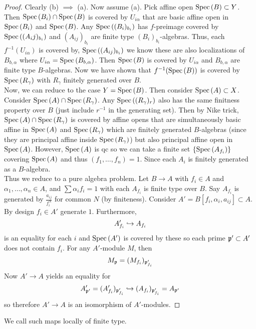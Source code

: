 \documentclass[12pt]{article}
\begin{document}
\begin{proof}
Clearly (b) $\implies$ (a). Now assume (a). Pick affine open $\mathrm{Spec}\left( B \right) \subset Y$. Then $\mathrm{Spec}\left( B_i \right) \cap \mathrm{Spec}\left( B \right)$ is covered by $U_{i \alpha}$ that are basic affine open in $\mathrm{Spec}\left( B_i \right)$ and $\mathrm{Spec}\left( B \right)$. Any $\mathrm{Spec}\left( (B_i)_{b_i} \right)$ has $f$-preimage covered by $\mathrm{Spec}\left( (A_ij)_{b_i} \right)$ and $(A_{ij})_{b_i}$ are finite type $(B_i)_{b_i}$-algebras. Thus, each $f^{-1}(U_{i\alpha})$ is covered by, $\mathrm{Spec}\left( (A_{ij})_{b_i} \right)$ we know these are also localizations of $B_{b, \alpha}$ where $U_{i\alpha} = \mathrm{Spec}\left( B_{b,\alpha} \right)$. Then $\mathrm{Spec}\left( B \right)$ is covered by $U_{i\alpha}$ and $B_{b,\alpha}$ are finite type $B$-algebras. Now we have shown that $f^{-1}(\mathrm{Spec}\left( B \right))$ is covered by $\mathrm{Spec}\left( R_\gamma \right)$ with $R_\gamma$ finitely generated over $B$.
\bigskip\\
Now, we can reduce to the case $Y = \mathrm{Spec}\left( B \right)$. Then consider $\mathrm{Spec}\left( A \right) \subset X$. Consider $\mathrm{Spec}\left( A \right) \cap \mathrm{Spec}\left( R_\gamma \right)$. Any $\mathrm{Spec}\left( (R_\gamma)_r \right)$ also has the same finitness property over $B$ (just include $r^{-1}$ in the generating set). Then by Nike trick, $\mathrm{Spec}\left( A \right) \cap \mathrm{Spec}\left( R_\gamma \right)$ is covered by affine opens that are simultaneously basic affine in $\mathrm{Spec}\left( A \right)$ and $\mathrm{Spec}\left( R_\gamma \right)$ which are finitely generated $B$-algebras (since they are principal affine inside $\mathrm{Spec}\left( R_\gamma \right)$) but also principal affine open in $\mathrm{Spec}\left( A \right)$. However, $\mathrm{Spec}\left( A \right)$ is qc so we can take a finite set $\{ \mathrm{Spec}\left( A_{f_i} \right) \}$ covering $\mathrm{Spec}\left( A \right)$ and thus $(f_1, \dots, f_n) = 1$. Since each $A_i$ is finitely generated as a $B$-algebra. 
\bigskip\\
Thus we reduce to a pure algebra problem. Let $B \to A$ with $f_i \in A$ and $\alpha_1, \dots, \alpha_n \in A$, and $\sum \alpha_i f_i = 1$ with each $A_{f_i}$ is finite type over $B$. Say $A_{f_i}$ is generated by $\frac{a_{ij}}{f_i^N}$ for common $N$ (by finiteness). Consider $A' = B[f_i, \alpha_i, a_{ij}] \subset A$. By design $f_i \in A'$ generate $1$. Furthermore,
\[ A_{f_i}' \hookrightarrow A_{f_i} \]
is an equality for each $i$ and $\mathrm{Spec}\left( A' \right)$ is covered by these so each prime $\mathfrak{p}' \subset A'$ does not contain $f_i$. For any $A'$-module $M$, then \[ M_{\mathfrak{p}} = (M_{f_i})_{\mathfrak{p}'_{f_i}} \]
Now $A' \to A$ yields an equality for 
\[ A'_{\mathfrak{p}'} = (A'_{f_i})_{\mathfrak{p}'_{f_i}} \hookrightarrow (A_{f_i})_{\mathfrak{p}'_{f_i}} = A_{\mathfrak{p}'} \]
so therefore $A' \to A$ is an isomorphism of $A'$-modules.
\end{proof}

\begin{defn}
We call such maps locally of finite type.
\end{defn}
\end{document}
